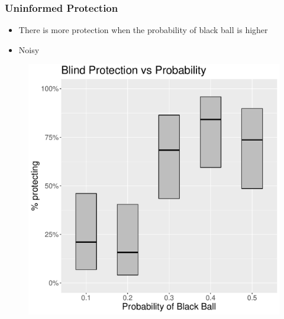 \documentclass[11pt,hyperref={bookmarks=false}]{beamer}
\begin{document}
\begin{frame}
\frametitle{Uninformed Protection}
\begin{itemize}
\item There is more protection when the probability of black ball is higher
\item Noisy
\end{itemize}
\begin{figure}[h]
\includegraphics[scale=0.4]{Graphs/BLProt_plot2.pdf}
\end{figure}
\end{frame}
\end{document}
